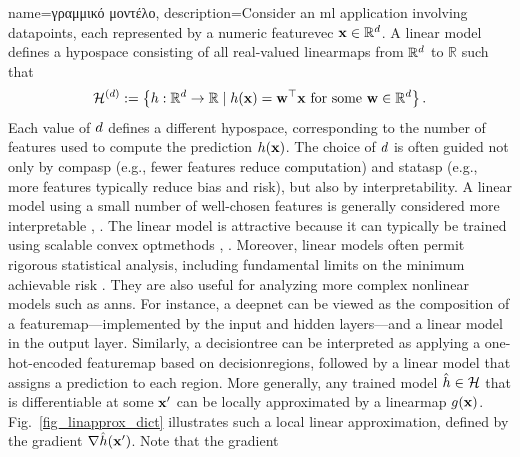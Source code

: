 {name={\foreignlanguage{greek}{γραμμικό μοντέλο}},
	description={Consider 
		an \gls{ml} application involving \gls{datapoint}s, each represented 
		by a numeric \gls{featurevec} ${\bf x} \in \mathbb{R}^{d}$. A linear \gls{model} defines 
		a \gls{hypospace} consisting of all real-valued \gls{linearmap}s from $\mathbb{R}^{d}$ to $\mathbb{R}$ such that
		\begin{equation}
			\nonumber
			\label{equ_def_lin_model_hypspace_dict}
			\mathcal{H}^{(d)} := \left\{ h: \mathbb{R}^{d} \rightarrow \mathbb{R} \mid h({\bf x}) = {\bf w}^{\top} {\bf x} \text{ for some } {\bf w} \in \mathbb{R}^{d} \right\}.
		\end{equation}
		Each value of $d$ defines a different \gls{hypospace}, corresponding to the number of 
		\gls{feature}s used to compute the \gls{prediction} $h({\bf x})$. The choice of 
		$d$ is often guided not only by \gls{compasp} (e.g., fewer features reduce computation) and 
		\gls{statasp} (e.g., more features typically reduce \gls{bias} and \gls{risk}), but also by \gls{interpretability}. 
		A linear \gls{model} using a small number of well-chosen \gls{feature}s is generally considered 
		more interpretable \cite{rudin2019stop}, \cite{Ribeiro2016}.
		The linear \gls{model} is attractive because it can typically be trained using scalable \gls{convex} \gls{optmethod}s 
		\cite{hastie01statisticallearning}, \cite{BertsekasNonLinProgr}. Moreover, linear \gls{model}s often permit rigorous 
		statistical analysis, including fundamental limits on the \gls{minimum} achievable \gls{risk} \cite{Wain2019}. 
		They are also useful for analyzing more complex nonlinear \gls{model}s such as \gls{ann}s. For instance, 
		a \gls{deepnet} can be viewed as the composition of a \gls{featuremap}—implemented by the input and 
		hidden \gls{layer}s—and a linear \gls{model} in the output \gls{layer}. Similarly, a \gls{decisiontree} can be interpreted 
		as applying a one-hot-encoded \gls{featuremap} based on \gls{decisionregion}s, followed by a linear 
		\gls{model} that assigns a \gls{prediction} to each region.
		More generally, any trained \gls{model} $\hat{h} \in \mathcal{H}$ that is 
		\gls{differentiable} at some ${\bf x}'$ can be locally approximated by a \gls{linearmap} 
		$g({\bf x})$. Fig.~\ref{fig_linapprox_dict} illustrates such a local linear approximation, 
		defined by the \gls{gradient} $\nabla \hat{h}({\bf x}')$. Note that the \gls{gradient} 
}}
